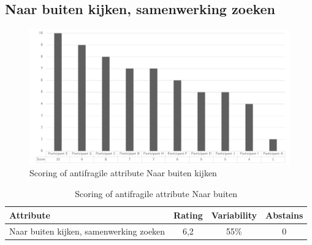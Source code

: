\subsection{Naar buiten kijken, samenwerking zoeken}
\begin{figure}[h!]
	\centering
	\includegraphics[width=0.9\linewidth]{images/scoreafnaarbuitenkijken}
	\caption[Scoring of antifragile attribute Naar buiten kijken]{Scoring of antifragile attribute Naar buiten kijken}
	\label{fig:appscoringafnaarbuiten}
\end{figure}
\begin{table}[h!]
	\centering
	\begin{tabular}{p{}ccc}
		\toprule
		\textbf{Attribute} & \textbf{Rating} & \textbf{Variability} & \textbf{Abstains} \\
		\midrule
		Naar buiten kijken, samenwerking zoeken & 6,2 & 55\% & 0 \\%
		\bottomrule
	\end{tabular}%
	\caption[Scoring of antifragile attribute Naar buiten]{Scoring of antifragile attribute Naar buiten}
	\label{tab:appscoringafnaarbuitenkijken}%
\end{table}%
\newpage
